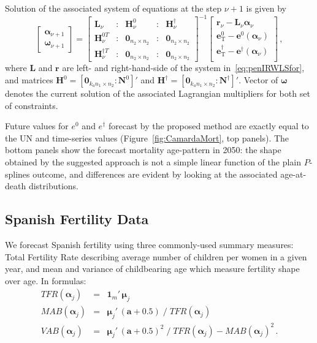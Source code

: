 \documentclass[12pt,a4paper,twoside]{article}
\begin{document}
Solution of the associated system of equations at the step $\nu + 1$ is given by
\begin{equation}\label{eq:SQLalg}
\left[ \begin{array}{l}
\bm{\alpha}_{\nu+1}\\
\bm{\omega}_{\nu+1}
\end{array}\right] = 
\left[ \begin{array}{lllll}
\bm{L}_{\nu}  &:& \bm{H}^{0}_{\nu} &:& \bm{H}^{\dagger}_{\nu}\\
\bm{H}_{\nu}^{0 T}  &:& \bm{0}_{n_{2} \times n_{2}}&:&\bm{0}_{n_{2} \times n_{2}}\\
\bm{H}_{\nu}^{\dagger T} &:& \bm{0}_{n_{2} \times n_{2}} &:& \bm{0}_{n_{2} \times n_{2}}
\end{array}\right]^{-1}
\left[ \begin{array}{c}
\bm{r}_{\nu} - \bm{L}_{\nu}\bm{\alpha}_{\nu}\\
\bm{e}^{0}_{\mathrm{T}} - \bm{e}^{0} (\bm{\alpha}_{\nu})\\
\bm{e}^{\dagger}_{\mathrm{T}} - \bm{e}^{\dagger} (\bm{\alpha}_{\nu})\\
\end{array}\right] \, ,
\end{equation}
where $\bm{L}$ and $\bm{r}$ are left- and right-hand-side of the system in~\eqref{eq:penIRWLSfor}, and matrices $\bm{H}^{0} = \left[\bm{0}_{k_{a}n_{1}\times n_{2}}:\bm{N}^{0} \right]'$ and $\bm{H}^{\dagger} = \left[\bm{0}_{k_{a}n_{1}\times n_{2}}:\bm{N}^{\dagger} \right]'$. Vector of $\bm{\omega}$ denotes the current solution of the associated Lagrangian multipliers for both set of constraints.

Future values for $e^{0}$ and $e^{\dagger}$ forecast by the proposed method are exactly equal to the UN and time-series values (Figure~\ref{fig:CamardaMort}, top panels). The bottom panels show the forecast mortality age-pattern in 2050: the shape obtained by the suggested approach is not a simple linear function of the plain $P$-splines outcome, and differences are evident by looking at the associated age-at-death distributions. 

\subsection{Spanish Fertility Data}

We forecast Spanish fertility using three commonly-used summary measures: Total Fertility Rate describing average number of children per women in a given year, and mean and variance of childbearing age which measure fertility shape over age. In formulas:
\begin{eqnarray}\label{eq:FertMea}
TFR(\bm{\alpha}_{j}) &=& \bm{1}_{m}' \, \bm{\mu}_{j}\\
MAB(\bm{\alpha}_{j}) &=& \bm{\mu}_{j}' \, (\bm{a}+0.5) \; / \; TFR(\bm{\alpha}_{j})\nonumber\\
VAB(\bm{\alpha}_{j}) &=& \bm{\mu}_{j}' \, (\bm{a}+0.5)^2 \; / \; TFR(\bm{\alpha}_{j}) - MAB(\bm{\alpha}_{j})^2\nonumber \, .
\end{eqnarray} 
\end{document}
